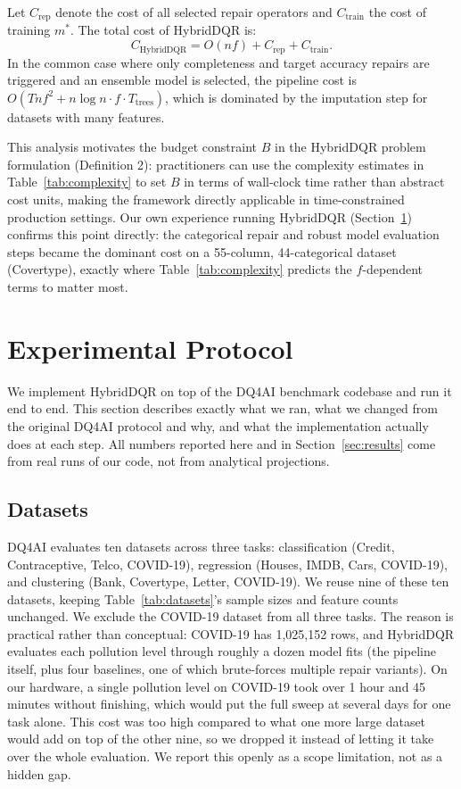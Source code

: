 \documentclass[runningheads]{llncs}
\begin{document}
Let $C_{\text{rep}}$ denote the cost of all selected repair operators
and $C_{\text{train}}$ the cost of training $m^*$.
The total cost of HybridDQR is:
\begin{equation}
  C_{\text{HybridDQR}} = O(nf) + C_{\text{rep}} + C_{\text{train}}.
\end{equation}
In the common case where only completeness and target accuracy
repairs are triggered and an ensemble model is selected, the
pipeline cost is
$O(Tnf^2 + n \log n \cdot f \cdot T_{\text{trees}})$,
which is dominated by the imputation step for datasets with
many features.

This analysis motivates the budget constraint $B$ in the
HybridDQR problem formulation (Definition 2): practitioners
can use the complexity estimates in Table~\ref{tab:complexity}
to set $B$ in terms of wall-clock time rather than abstract
cost units, making the framework directly applicable in
time-constrained production settings.
Our own experience running HybridDQR (Section~\ref{sec:experiments})
confirms this point directly: the categorical repair and robust
model evaluation steps became the dominant cost on a
55-column, 44-categorical dataset (Covertype), exactly where
Table~\ref{tab:complexity} predicts the $f$-dependent terms to
matter most.

\section{Experimental Protocol}
\label{sec:experiments}

We implement HybridDQR on top of the DQ4AI benchmark codebase and
run it end to end. This section describes exactly what we ran,
what we changed from the original DQ4AI protocol and why, and
what the implementation actually does at each step. All numbers
reported here and in Section~\ref{sec:results} come from real
runs of our code, not from analytical projections.

\subsection{Datasets}

DQ4AI evaluates ten datasets across three tasks: classification
(Credit, Contraceptive, Telco, COVID-19), regression (Houses,
IMDB, Cars, COVID-19), and clustering (Bank, Covertype, Letter,
COVID-19).
We reuse nine of these ten datasets, keeping Table~\ref{tab:datasets}'s
sample sizes and feature counts unchanged.
We exclude the COVID-19 dataset from all three tasks.
The reason is practical rather than conceptual: COVID-19 has
1,025,152 rows, and HybridDQR evaluates each pollution level
through roughly a dozen model fits (the pipeline itself, plus
four baselines, one of which brute-forces multiple repair
variants). On our hardware, a single pollution level on COVID-19
took over 1 hour and 45 minutes without finishing, which would
put the full sweep at several days for one task alone. This cost
was too high compared to what one more large dataset would add
on top of the other nine, so we dropped it instead of letting it
take over the whole evaluation. We report this openly as a scope
limitation, not as a hidden gap.
\end{document}
